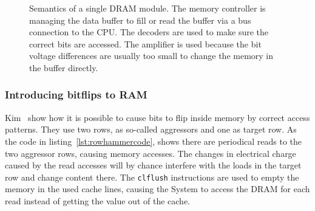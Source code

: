 \begin{figure}
  \centering
  \caption{Semantics of a single DRAM module. The memory controller is managing
the data buffer to fill or read the buffer via a bus connection to the CPU. The
decoders are used to make sure the correct bits are accessed. The amplifier is
used because the bit voltage differences are usually too small to change the
memory in the buffer directly.}
  \label{fig:DRAMscheme}
\end{figure}

\subsubsection{Introducing bitflips to RAM}

Kim~\etal\cite{rowhammergeneral} show how it is possible to cause bits to
flip inside memory by correct access patterns. They use two rows, as so-called
aggressors and one as target row. As the code in
listing~\ref{lst:rowhammercode}, shows there are periodical reads to the two
aggressor rows, causing memory accesses. The changes in electrical charge caused
by the read accesses will by chance interfere with the loads in the target row
and change content there. The \texttt{clflush} instructions are used to empty
the memory in the used cache lines, causing the System to access the DRAM for
each read instead of getting the value out of the cache.

